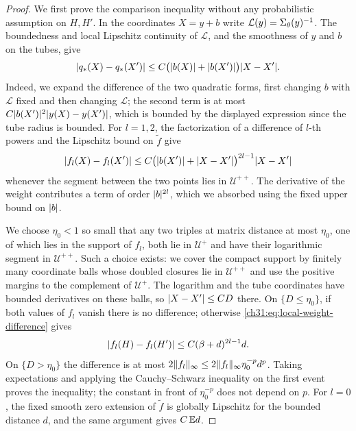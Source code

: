 \begin{proof}
We first prove the comparison inequality without any probabilistic assumption on $H,H'$. In the coordinates $X=y+b$ write $\mathcal L(y)=\Sigma_\theta(y)^{-1}$. The boundedness and local Lipschitz continuity of $\mathcal L$, and the smoothness of $y$ and $b$ on the tubes, give
\[
 \lvert q_*(X)-q_*(X')\rvert\le C\bigl(\lvert b(X)\rvert+\lvert b(X')\rvert\bigr)\lvert X-X'\rvert.
\]
Indeed, we expand the difference of the two quadratic forms, first changing $b$ with $\mathcal L$ fixed and then changing $\mathcal L$; the second term is at most $C\lvert b(X')\rvert^2\lvert y(X)-y(X')\rvert$, which is bounded by the displayed expression since the tube radius is bounded. For $l=1,2$, the factorization of a difference of $l$-th powers and the Lipschitz bound on $\widetilde f$ give
\begin{equation}\label{ch31:eq:local-weight-difference}
 \lvert f_l(X)-f_l(X')\rvert\le C\bigl(\lvert b(X')\rvert+\lvert X-X'\rvert\bigr)^{2l-1}\lvert X-X'\rvert
\end{equation}
whenever the segment between the two points lies in $\mathcal U^{++}$. The derivative of the weight contributes a term of order $\lvert b\rvert^{2l}$, which we absorbed using the fixed upper bound on $\lvert b\rvert$.

We choose $\eta_0<1$ so small that any two triples at matrix distance at most $\eta_0$, one of which lies in the support of $f_l$, both lie in $\mathcal U^+$ and have their logarithmic segment in $\mathcal U^{++}$. Such a choice exists: we cover the compact support by finitely many coordinate balls whose doubled closures lie in $\mathcal U^{++}$ and use the positive margins to the complement of $\mathcal U^+$. The logarithm and the tube coordinates have bounded derivatives on these balls, so $\lvert X-X'\rvert\le CD$ there. On $\{D\le\eta_0\}$, if both values of $f_l$ vanish there is no difference; otherwise \eqref{ch31:eq:local-weight-difference} gives
\[
 \lvert f_l(H)-f_l(H')\rvert\le C(\beta+d)^{2l-1}d.
\]
On $\{D>\eta_0\}$ the difference is at most $2\lVert f_l\rVert_\infty\le2\lVert f_l\rVert_\infty\eta_0^{-p}d^p$. Taking expectations and applying the Cauchy--Schwarz inequality on the first event proves the inequality; the constant in front of $\eta_0^{-p}$ does not depend on $p$. For $l=0$, the fixed smooth zero extension of $\widetilde f$ is globally Lipschitz for the bounded distance $d$, and the same argument gives $C\,\mathbb E d$.


\end{proof}
